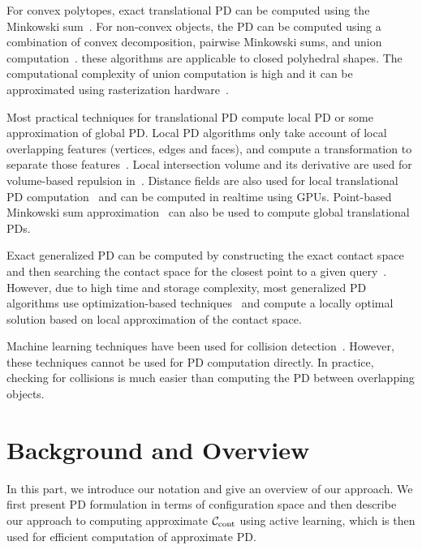 For convex polytopes, exact translational PD can be computed using
the Minkowski sum~\cite{Gino:2001:GDC,Agarwal:2000:CPD,Kim:2002:DEEP}.
For non-convex objects, the PD can be computed using a combination of convex decomposition, pairwise Minkowski sums, and union computation~\cite{Kim:2002:FPD}. these algorithms are applicable to closed polyhedral shapes. The computational complexity of union computation is high and it can be approximated using rasterization hardware~\cite{Kim:2002:FPD}.

Most practical techniques for translational PD compute local PD
or some approximation of global PD. Local PD algorithms only take
account of local overlapping features (vertices, edges and faces),
and compute a transformation to separate those
features~\cite{Guendelman:2003:NRB,Redon:2006:AFM,Lien:2009:ASM,Tang:2009:IHD,Tang:2012:CPF}. Local intersection volume and its derivative are used for volume-based repulsion in~\cite{Wang12}.
Distance fields are also used for local translational PD
computation~\cite{Heidelberger04} and can be computed in realtime using GPUs.
Point-based Minkowski
sum approximation~\cite{Lien:2008:CMS} can also be used to
compute global translational PDs.

Exact generalized PD can be computed by constructing the
exact contact space and then searching the contact space for the
closest point to a given query~\cite{Zhang:2007:GPD}. However,
due to high time and storage complexity, most
generalized PD algorithms use optimization-based
techniques~\cite{Nawratil:2009:GPD,Zhang:2007:AFP,Je:2012:PRP} and compute a locally
optimal solution based on local approximation of the contact space.

Machine learning techniques have been used for collision detection~\cite{Doshi:2007:ISRR,Pan:2011:ISRR}. However, these techniques cannot be used for PD computation directly. In practice, checking for collisions is much easier than computing the PD between overlapping objects.

\section{Background and Overview}
\label{sec:2:overview}
In this part, we introduce our notation and give an overview of our approach. We first present PD formulation in terms of configuration space and then describe our approach to computing approximate $\mathcal C_\text{cont}$ using active learning, which is then used for efficient computation of approximate PD.

